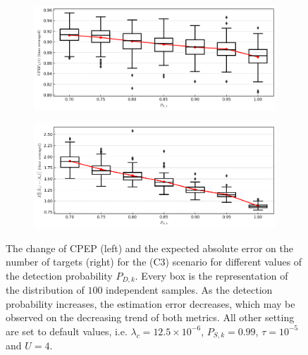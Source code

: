 \begin{figure}
    \centering
    \begin{subfigure}[]{0.48\linewidth}
        \centering
        \includegraphics[width=\linewidth]{figures/c3-pd-cpep.png}
    \end{subfigure}
    \hfill
    \begin{subfigure}[]{0.48\linewidth}
        \centering
        \includegraphics[width=\linewidth]{figures/c3-pd-eae.png}
    \end{subfigure}
  \caption[(C3). Change of performance depending on the detection probability.]{The change of CPEP (left) and the expected absolute error on the number of targets (right) for the (C3) scenario for different values of the detection probability $P_{D,k}$. Every box is the representation of the distribution of $100$ independent samples. As the detection probability increases, the estimation error decreases, which may be observed on the decreasing trend of both metrics. All other setting are set to default values, i.e. $\lambda_{c} = 12.5 \times 10^{-6}$, $P_{S,k} = 0.99$, $\tau = 10^{-5}$ and $U = 4$.}
  \label{fig:c3-pd}
\end{figure}


